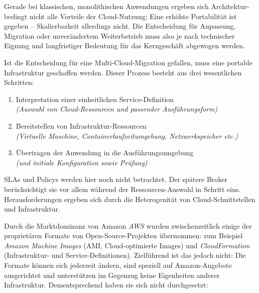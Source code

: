 \noindent
Gerade bei klassischen, monolithischen Anwendungen ergeben sich Architektur-bedingt nicht alle Vorteile der Cloud-Nutzung; Eine erhöhte Portabilität ist gegeben --  Skalierbarkeit allerdings nicht. Die Entscheidung für Anpassung, Migration oder unverändertem Weiterbetrieb muss also je nach technischer Eignung und langfristiger Bedeutung für das Kerngeschäft abgewogen werden.

Ist die Entscheidung für eine Multi-Cloud-Migration gefallen, muss eine portable Infrastruktur geschaffen werden. Dieser Prozess besteht aus drei wesentlichen Schritten:

\begin{enumerate}
	
	\item Interpretation einer einheitlichen Service-Definition
	\\\emph{(Auswahl von Cloud-Ressourcen und passender Ausführungsform)}
	
	\item Bereitstellen von Infrastruktur-Ressourcen 
	\\\emph{(Virtuelle Maschine, Containerlaufzeitumgebung, Netzwerkspeicher etc.)}
	
	\item Übertragen der Anwendung in die Ausführungsumgebung
	\\\emph{(und initiale Konfiguration sowie Prüfung)}
	
\end{enumerate}

\noindent
SLAs und Policys werden hier noch nicht betrachtet. Der spätere Broker berücksichtigt sie vor allem während der Ressourcen-Auswahl in Schritt eins. Herausforderungen ergeben sich durch die Heterogenität von Cloud-Schnittstellen und Infrastruktur.

Durch die Marktdominanz von Amazon \emph{AWS} wurden zwischenzeitlich einige der proprietären Formate von Open-Source-Projekten übernommen: zum Beispiel \emph{Amazon Machine Images} (AMI, Cloud-optimierte Images) und \emph{CloudFormation} (Infrastruktur- und Service-Definitionen). Zielführend ist das jedoch nicht: Die Formate können sich jederzeit ändern, sind speziell auf Amazon-Angebote ausgerichtet und unterstützen im Gegenzug keine Eigenheiten anderer Infrastruktur. Dementsprechend haben sie sich nicht durchgesetzt:

